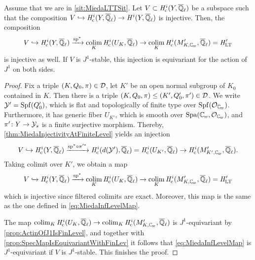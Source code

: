 \documentclass[../main.tex]{subfiles}
\begin{document}
\begin{thm}\label{thm:MiedaAppliedToLTT}
  Assume that we are in \cref{sit:MiedaLTTSit}.
  Let $V \subset \mathit H_{\mathrm{c}}^i(Y, {\overline {\mathbb{Q}}_\ell})$ be a subspace such that the composition 
  $V \hookrightarrow \mathit H_{\mathrm{c}}^i(Y, {\overline {\mathbb{Q}}_\ell}) \to \mathit H^i(Y, {\overline {\mathbb{Q}}_\ell})$ is injective. Then, the composition
  \begin{equation}\label{eq:MiedaInfLevelMap}
  V \inj \hHc^i(Y, \Qlbar) \xto{\specmap^*} \colim_K \hHc^{i}(U_K, \Qlbar)
  \to \colim_K \hHc^i(M'_{K,\Cp}, \Qlbar) = \HLT'
  \end{equation}
  is injective as well. If $V$ is $J^1$-stable, this injection is equivariant 
  for the action of $J^1$ on both sides.
\begin{proof}
  Fix a triple $(K, Q_0, \pi) \in \mathcal{D}$, let $K'$ be an open normal subgroup 
  of $K_0$ contained in $K$. Then there is a triple $(K, Q_0, \pi) \leq (K', Q_0', \pi') \in \mathcal{D}$. We write $\mathcal{Y}' = \operatorname{Spf}(Q_0')$,
  which is flat and topologically of finite type over $\spf(\cO_\Cp)$. 
  Furthermore, it has generic fiber $U_{K'}$, which is smooth over 
  $\spa(\Cp, \cO_\Cp)$, and $\pi'\colon Y \to \mathcal{Y}_s$ is a finite surjective
  morphism.
  Thereby, \cref{thm:MiedaInjectivityAtFiniteLevel} yields an injection
  \begin{equation*}
    V \inj \hHc^i(Y, \Qlbar) \xto{\specmap^* \circ \pi'^*} 
    \hHc^i(d(\cY'), \Qlbar) = \hHc^i(U_{K'}, \Qlbar) \to \hHc^i(M'_{K', \Cp}, \Qlbar).
  \end{equation*}
  Taking colimit over $K'$, we obtain a map
  \begin{equation*}
    V \inj \hHc^i(Y, \Qlbar) \xto{\specmap^*} \colim_K \hHc^{i}(U_K, \Qlbar)
    \to \colim_K \hHc^i(M'_{K,\Cp}, \Qlbar) = \HLT'
  \end{equation*}
  which is injective since filtered colimits are exact.
  Moreover, this map is the same as the one defined in
  \eqref{eq:MiedaInfLevelMap}.

  The map $\colim_K \hHc^{i}(U_K, \Qlbar) \to \colim_K \hHc^i(M'_{K,\Cp}, \Qlbar)$
  is $J^1$-equivariant by \cref{prop:ActinOfJ1IsFinLevel}, and together with 
  \cref{prop:SpecMapIsEquivariantWithFinLev} it follows that
  \eqref{eq:MiedaInfLevelMap} is $J^1$-equivariant if $V$ is $J^1$-stable. This finishes the proof.
\end{proof}
\end{thm}


\end{document}
